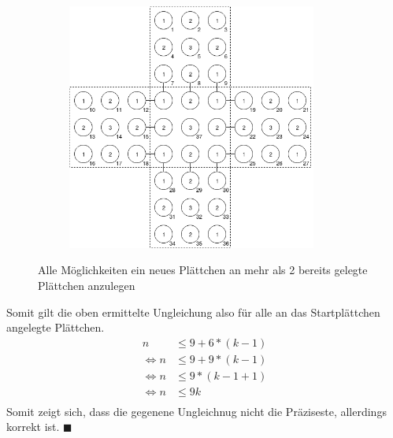 \documentclass{article}
\newcommand*{\qed}{\hfill\ensuremath{\blacksquare}\\}%
\begin{document}
\begin{figure}[H]
\begin{subfigure}{.5\textwidth}
	\end{subfigure}%
	\begin{subfigure}{.5\textwidth}
		\centering
		\includegraphics[width=0.9\textwidth]{aufgabe2_5.png}
	\end{subfigure}
	\caption{Alle M\"oglichkeiten ein neues Pl\"attchen an mehr als 2 bereits gelegte Pl\"attchen anzulegen}
\end{figure}
Somit gilt die oben ermittelte Ungleichung also f\"ur alle an das Startpl\"attchen angelegte Pl\"attchen.
\begin{align*}
n &\leq 9 + 6*(k-1)\\
\Leftrightarrow n &\leq 9 + 9*(k-1)\\
\Leftrightarrow n &\leq 9*(k-1+1)\\ 
\Leftrightarrow n &\leq 9k\\
\end{align*}
Somit zeigt sich, dass die gegenene Ungleichnug nicht die Pr\"aziseste, allerdings korrekt ist.
\qed
\end{document}

